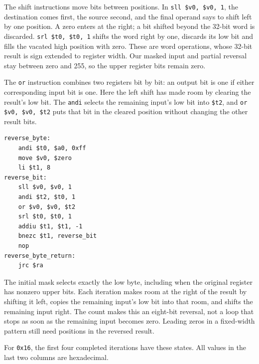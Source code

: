 The shift instructions move bits between positions. In
\texttt{sll \$v0, \$v0, 1}, the destination comes first, the source second,
and the final operand says to shift left by one position. A zero enters at the
right; a bit shifted beyond the 32-bit word is discarded.
\texttt{srl \$t0, \$t0, 1} shifts the word right by one, discards its low bit
and fills the vacated high position with zero. These are word operations, whose
32-bit result is sign extended to register width. Our masked input and partial
reversal stay between zero and 255, so the upper register bits remain zero.

The \texttt{or} instruction combines two registers bit by bit: an output bit is
one if either corresponding input bit is one. Here the left shift has made room
by clearing the result's low bit. The \texttt{andi} selects the remaining input's
low bit into \texttt{\$t2}, and \texttt{or \$v0, \$v0, \$t2} puts that bit
in the cleared position without changing the other result bits.

\noindent\begin{minipage}{\linewidth}
  \begin{verbatim}
reverse_byte:
    andi $t0, $a0, 0xff
    move $v0, $zero
    li $t1, 8
reverse_bit:
    sll $v0, $v0, 1
    andi $t2, $t0, 1
    or $v0, $v0, $t2
    srl $t0, $t0, 1
    addiu $t1, $t1, -1
    bnezc $t1, reverse_bit
    nop
reverse_byte_return:
    jrc $ra
\end{verbatim}
\end{minipage}

The initial mask selects exactly the low byte, including when the original
register has nonzero upper bits. Each iteration makes room at the right of the
result by shifting it left, copies the remaining input's low bit into that room,
and shifts the remaining input right. The count makes this an eight-bit reversal,
not a loop that stops as soon as the remaining input becomes zero. Leading zeros
in a fixed-width pattern still need positions in the reversed result.

For \texttt{0x16}, the first four completed iterations have these states. All
values in the last two columns are hexadecimal.

